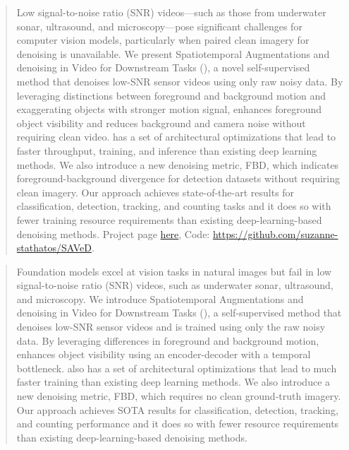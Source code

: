 \begin{abstract}
    Low signal-to-noise ratio (SNR) videos—such as those from underwater sonar, ultrasound, and microscopy—pose significant challenges for computer vision models, particularly when paired clean imagery for denoising is unavailable.
    We present Spatiotemporal Augmentations and denoising in Video for Downstream Tasks (\NAME{}), a novel self-supervised method that denoises low-SNR sensor videos using only raw noisy data. By leveraging distinctions between foreground and background motion and exaggerating objects with stronger motion signal, \NAME{} enhances foreground object visibility and reduces background and camera noise without requiring clean video. \NAME{} has a set of architectural optimizations that lead to faster throughput, training, and inference than existing deep learning methods. We also introduce a new denoising metric, FBD, which indicates foreground-background divergence for detection datasets without requiring clean imagery. Our approach achieves state-of-the-art results for classification, detection, tracking, and counting tasks and it does so with fewer training resource requirements than existing deep-learning-based denoising methods. Project page \href{https://suzanne-stathatos.github.io/SAVeD}{here}, Code: \href{https://github.com/suzanne-stathatos/SAVeD}{https://github.com/suzanne-stathatos/SAVeD}.
\end{abstract}

\iffalse
\begin{abstract}
    Foundation models excel at vision tasks in natural images but fail in low signal-to-noise ratio (SNR) videos, such as underwater sonar, ultrasound, and microscopy. We introduce Spatiotemporal Augmentations and denoising in Video for Downstream Tasks (\NAME{}), a self-supervised method that denoises low-SNR sensor videos and is trained using only the raw noisy data. By leveraging differences in foreground and background motion, \NAME{} enhances object visibility using an encoder-decoder with a temporal bottleneck. \NAME{} also has a set of architectural optimizations that lead to much faster training than existing deep learning methods. We also introduce a new denoising metric, FBD, which requires no clean ground-truth imagery. Our approach achieves SOTA results for classification, detection, tracking, and counting performance and it does so with fewer resource requirements than existing deep-learning-based denoising methods.
\end{abstract}

